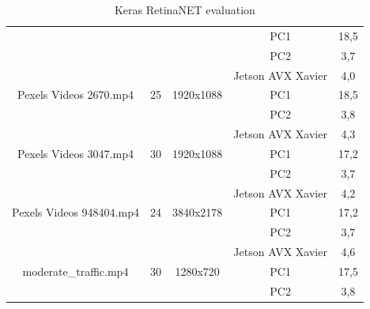 \documentclass[twoside]{ctuthesis}
\theoremstyle{plain}
\theoremstyle{definition}
\theoremstyle{note}
\begin{document}
\begin{table}[H]
{\begin{tabular}{|c|c|c|c|c|}
			&                     &                            & PC1               & 18,5         \\ \cline{4-5} 
			&                     &                            & PC2               & 3,7          \\ \hline
			\multirow{3}{*}{Pexels Videos 2670.mp4}                                                                                                           & \multirow{3}{*}{25} & \multirow{3}{*}{1920x1088} & Jetson AVX Xavier & 4,0          \\ \cline{4-5} 
			&                     &                            & PC1               & 18,5         \\ \cline{4-5} 
			&                     &                            & PC2               & 3,8          \\ \hline
			\multirow{3}{*}{Pexels Videos 3047.mp4}                                                                                                           & \multirow{3}{*}{30} & \multirow{3}{*}{1920x1088} & Jetson AVX Xavier & 4,3          \\ \cline{4-5} 
			&                     &                            & PC1               & 17,2         \\ \cline{4-5} 
			&                     &                            & PC2               & 3,7          \\ \hline
			\multirow{3}{*}{Pexels Videos 948404.mp4}                                                                                                         & \multirow{3}{*}{24} & \multirow{3}{*}{3840x2178} & Jetson AVX Xavier & 4,2          \\ \cline{4-5} 
			&                     &                            & PC1               & 17,2         \\ \cline{4-5} 
			&                     &                            & PC2               & 3,7          \\ \hline
			\multirow{3}{*}{moderate\_traffic.mp4}                                                                                                            & \multirow{3}{*}{30} & \multirow{3}{*}{1280x720}  & Jetson AVX Xavier & 4,6          \\ \cline{4-5} 
			&                     &                            & PC1               & 17,5         \\ \cline{4-5} 
			&                     &                            & PC2               & 3,8          \\ \hline
		\end{tabular}%
	}
	\caption{Keras RetinaNET evaluation}
	\label{retina-eval}
\end{table}
	
\end{document}
